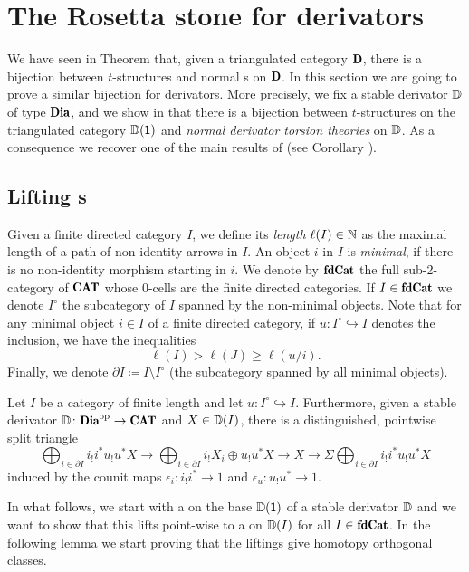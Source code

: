 \color{black}
\section{The Rosetta stone for derivators}
We have seen in Theorem  that, given a triangulated category $\cD$, there is a bijection between $t$-structures and normal {\htth}s on $\cD$. In this section we are going to prove a similar bijection for derivators. More precisely, we fix a stable derivator $\mathbb{D}$ of type $\Dia$, and we show in \athm{} that there is a bijection between $t$-structures on the triangulated category $\D(\uno)$ and \emph{normal derivator torsion theories} on $\mathbb{D}$. As a consequence we recover one of the main results of \cite{Fiorenza2014} (see Corollary ). 
\subsection{Lifting {\hfs}s}
\begin{notat}\label{notation_rosetta}
Given a finite directed category $I$, we define its \emph{length} $\ell(I)\in \mathbb{N}$ as the maximal length of a path of non-identity arrows in $I$. An object $i$ in $I$ is \emph{minimal}, if there is no non-identity morphism starting in $i$. We denote by $\fincat$ the full sub-2-category of $\Cat$ whose $0$-cells are the finite directed categories. If $I\in\fincat$ we denote $I^\circ$ the subcategory of $I$ spanned by the non-minimal objects. Note that for any minimal object $i\in I$ of a finite directed category, if $u\colon I^\circ\hookrightarrow I$ denotes the inclusion, we have the inequalities
\[
\ell(I)>\ell(J)\geq \ell(u/i).
\] 
Finally, we denote $\partial I \coloneqq I\setminus I^\circ$ (\ie the subcategory spanned by all minimal objects).
\end{notat}
\begin{lemma}{\rm \cite{SSV}}\label{lemma_approximation_SSV}
Let $I$ be a category of finite length and let $u\colon I^\circ\hookrightarrow I$. Furthermore, given a stable derivator $\D\colon \Dia^\opp\to \Cat$ and $X\in \mathbb{D}(I)$, there is a distinguished, pointwise split triangle
\[
\bigoplus_{i\in\partial I}i_!i^*u_!u^*X\to \bigoplus_{i\in\partial I}i_!X_i\oplus u_!u^*X\to X\to \Sigma \bigoplus_{i\in\partial I}i_!i^*u_!u^*X
\]
induced by the counit maps $\epsilon_i : i_!i^*\to 1$ and $\epsilon_u : u_!u^* \to 1$.
\end{lemma}
In what follows, we start with a \hfs on the base $\D(\uno)$ of a stable derivator $\mathbb{D}$ and we want to show that this lifts point-wise to a \hfs on $\mathbb{D}(I)$ for all $I\in \fincat$. In the following lemma we start proving that the liftings give homotopy orthogonal classes.
